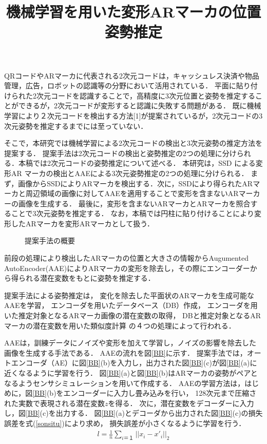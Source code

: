 \documentclass{jsarticle}
\title{機械学習を用いた変形ARマーカの位置姿勢推定}
\begin{document}
\maketitle

QRコードやARマーカに代表される2次元コードは，キャッシュレス決済や物品管理，広告，ロボットの認識等の分野において活用されている．
平面に貼り付けられた2次元コードを認識することで，高精度に3次元位置と姿勢を推定することができるが，2次元コードが変形すると認識に失敗する問題がある．
既に機械学習により２次元コードを検出する方法[1]が提案されているが，2次元コードの3次元姿勢を推定するまでには至っていない．

そこで，本研究では機械学習による2次元コードの検出と3次元姿勢の推定方法を提案する．
提案手法は2次元コードの検出と姿勢推定の2つの処理に分けられる．本稿では2次元コードの姿勢推定について述べる．
本研究は，SSD による変形AR マーカの検出とAAEによる3次元姿勢推定の2つの処理に分けられる．
まず，画像からSSDによりARマーカを検出する．次に，SSDにより得られたARマーカと周辺領域の画像に対してAAEを適用することで変形を含まないARマーカーの画像を生成する．
最後に，変形を含まないARマーカとARマーカを照合することで3次元姿勢を推定する．
なお，本稿では円柱に貼り付けることにより変形したARマーカを変形ARマーカとして扱う．

\begin{figure}[ht]
\vspace{0zh}
\setlength{\epsfxsize}{7.5cm}
\centerline{}
\vspace{-1zh}
\caption{提案手法の概要}
\label{flow}
\vspace{-2zh}
\end{figure}

前段の処理により検出したARマーカの位置と大きさの情報からAugumented AutoEncoder(AAE)によりARマーカの変形を除去し，その際にエンコーダーから得られる潜在変数をもとに姿勢を推定する．

提案手法による姿勢推定は，
変化を除去した平面状のARマーカを生成可能な
AAEを学習，
エンコーダを用いたデータベース（DB）作成，
エンコーダを用いた推定対象となるARマーカ画像の潜在変数の取得，
DBと推定対象となるARマーカの潜在変数を用いた類似度計算
の４つの処理によって行われる．

AAEは，訓練データにノイズや変形を加えて学習し，ノイズの影響を除去した画像を生成する手法である．
AAEの流れを図\ref{BB}に示す．
提案手法では，オートエンコーダ（AE）に図\ref{BB}(b)を入力し，出力された図\ref{BB}(c)が図\ref{BB}(a)に近くなるように学習を行う．
図\ref{BB}(a)と図\ref{BB}(b)はARマーカの姿勢がペアとなるようセンサシミュレーションを用いて作成する．
AAEの学習方法は，はじめに，図\ref{BB}(b)をエンコーダーに入力し畳み込みを行い，
128次元まで圧縮された実数で表現される潜在変数$z$を得る．
次に，潜在変数をデコーダーに入力し，図\ref{BB}(c)を出力する．
図\ref{BB}(a)とデコーダから出力された図\ref{BB}(c)の損失誤差を式(\ref{sonsitu})により求め，
損失誤差が小さくなるように学習を行う．
\begin{eqnarray}
\label{sonsitu}
l=\frac{1}{n}\sum_{i＝１} ||x_i-x'_i||_2
\end{eqnarray}
\end{document}
